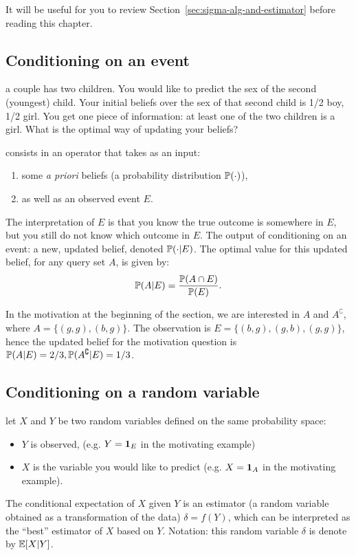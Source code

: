 \documentclass{article}
\begin{document}
It will be useful for you to review Section~\ref{sec:sigma-alg-and-estimator} before reading this chapter.


\subsection{Conditioning on an event}

 a couple has two children. You would like to predict the sex of the second (youngest) child. Your initial beliefs over the sex of that second child is 1/2 boy, 1/2 girl. You get one piece of information: at least one of the two children is a girl. What is the optimal way of updating your beliefs?

 consists in an operator that takes as an input:
\begin{enumerate}
  \item some \emph{a priori} beliefs (a probability distribution $\P(\cdot)$), 
  \item as well as an observed event $E$. 
\end{enumerate}
The interpretation of $E$ is that you know the true outcome is somewhere in $E$, but you still do not know which outcome in $E$. The output of conditioning on an event: a new, updated belief, denoted $\P(\cdot | E)$. The optimal value for this updated belief, for any query set $A$, is given by:
\[ \P(A | E) = \frac{\P(A\cap E)}{\P(E)}. \]

 In the motivation at the beginning of the section, we are interested in $A$ and $A^\complement$, where $A = \{(g,g), (b,g)\}$. The observation is $E = \{(b,g),(g,b),(g,g)\}$, hence the updated belief for the motivation question is $\P(A|E) = 2/3, \P(A^\complement|E) = 1/3$.


\subsection{Conditioning on a random variable}

 let $X$ and $Y$ be two random variables defined on the same probability space:
\begin{itemize}
  \item $Y$ is observed, (e.g. $Y = \1_E$ in the motivating example)
  \item $X$ is the variable you would like to predict (e.g. $X = \1_A$ in the motivating example).
\end{itemize}
The conditional expectation of $X$ given $Y$ is an estimator (a random variable obtained as a transformation of the data) $\delta = f(Y)$, which can be interpreted as the ``best'' estimator of $X$ based on $Y$. Notation: this random variable $\delta$ is denote by $\E[X|Y]$.
\end{document}
